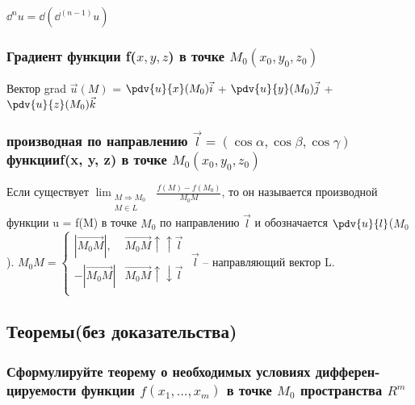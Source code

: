 \documentclass[a4paper, 12pt]{article}
\newcommand{\Rm}{\texorpdfstring{$R^m$}{Lg}}
\def\newline{}%
\begin{document}
            ${\dd}^n u = \dd({\dd}^(n-1) u)$

            \subsubsection{Градиент функции f(\texorpdfstring{$x, y, z$}{Lg}) в точке \texorpdfstring{$M_0(x_0, y_0, z_0)$}{Lg}}

            Вектор grad $\vec{u}(M)$ = $\pdv{u}{x}(M_0) \vec{i}$ + $\pdv{u}{y}(M_0) \vec{j}$
            + $\pdv{u}{z}(M_0) \vec{k}$

            \subsubsection{производная по направлению \texorpdfstring{$\vec{l} = (\cos\alpha, \cos \beta, \cos \gamma)$}{Lg} функции\newline f(x, y, z) в точке \texorpdfstring{$M_0(x_0, y_0, z_0)$}{Lg}}

            Если существует $\displaystyle{\lim_{\substack{M \Rightarrow M_0\\M\in L}}}$
            $\frac{f(M) - f(M_0)}{M_0M}$, то он называется производной функции\newline
            u = f(M) в точке $M_0$ по направлению $\vec{l}$ и обозначается 
            $\pdv{u}{l}$($M_0$).\newline
            $M_0M =
            \begin{cases}
                |\overrightarrow{M_0M}|, & \overrightarrow{M_0 M} \uparrow\uparrow \vec{l}\\
                -|\overrightarrow{M_0M}| & \overrightarrow{M_0 M} \uparrow\downarrow \vec{l}\\
            \end{cases}$\newline
            $\vec{l}$ -- направляющий вектор L.

        \subsection{Теоремы(без доказательства)}
            \subsubsection{Сформулируйте теорему о необходимых условиях дифферен-\newline цируемости функции \texorpdfstring{$f(x_1, \ldots, x_m)$}{Lg} в точке \texorpdfstring{$M_0$}{Lg} пространства \Rm}
\end{document}

